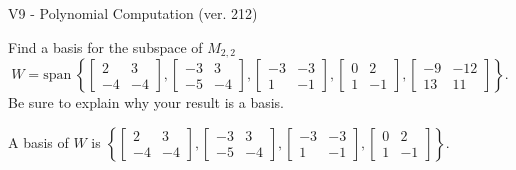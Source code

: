 \begin{exercise}
  \begin{exerciseTitle}V9 - Polynomial Computation (ver. 212)\end{exerciseTitle}
  \begin{exerciseStatement}
    Find a basis for the subspace of \(M_{2,2}\) 
\[W=\mathrm{span}\ \left\{\left[\begin{array}{cc}
2 & 3 \\
-4 & -4
\end{array}\right] , \left[\begin{array}{cc}
-3 & 3 \\
-5 & -4
\end{array}\right] , \left[\begin{array}{cc}
-3 & -3 \\
1 & -1
\end{array}\right] , \left[\begin{array}{cc}
0 & 2 \\
1 & -1
\end{array}\right] , \left[\begin{array}{cc}
-9 & -12 \\
13 & 11
\end{array}\right]\right\}.\]
 Be sure to explain why your result is a basis.


  \end{exerciseStatement}
  \begin{exerciseAnswer}
   A basis of \(W\) is  \(\left\{\left[\begin{array}{cc}
2 & 3 \\
-4 & -4
\end{array}\right] , \left[\begin{array}{cc}
-3 & 3 \\
-5 & -4
\end{array}\right] , \left[\begin{array}{cc}
-3 & -3 \\
1 & -1
\end{array}\right] , \left[\begin{array}{cc}
0 & 2 \\
1 & -1
\end{array}\right]\right\}\).
  


  \end{exerciseAnswer}
\end{exercise}